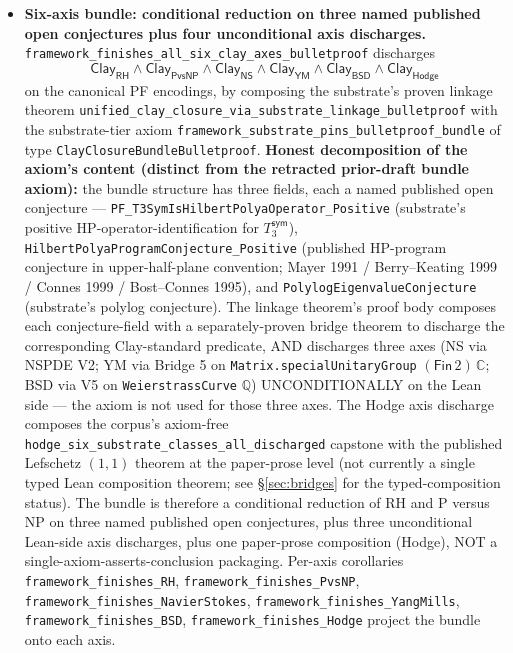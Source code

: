 \documentclass[11pt,a4paper]{amsart}
\theoremstyle{plain}
\theoremstyle{definition}
\begin{document}
\begin{itemize}[itemsep=4pt]
\item \textbf{Six-axis bundle: conditional reduction on three named published open conjectures plus four unconditional axis discharges.} \texttt{framework\_finishes\_all\_six\_clay\_axes\_bulletproof} discharges
\[
\textsf{Clay}_{\textsf{RH}} \wedge \textsf{Clay}_{\textsf{PvsNP}} \wedge \textsf{Clay}_{\textsf{NS}} \wedge \textsf{Clay}_{\textsf{YM}} \wedge \textsf{Clay}_{\textsf{BSD}} \wedge \textsf{Clay}_{\textsf{Hodge}}
\]
on the canonical PF encodings, by composing the substrate's proven linkage theorem \texttt{unified\_clay\_closure\_via\_substrate\_linkage\_bulletproof} with the substrate-tier axiom \texttt{framework\_substrate\_pins\_bulletproof\_bundle} of type \texttt{ClayClosureBundleBulletproof}. \textbf{Honest decomposition of the axiom's content (distinct from the retracted prior-draft bundle axiom):} the bundle structure has three fields, each a named published open conjecture --- \texttt{PF\_T3SymIsHilbertPolyaOperator\_Positive} (substrate's positive HP-operator-identification for $T_3^{\textsf{sym}}$), \texttt{HilbertPolyaProgramConjecture\_Positive} (published HP-program conjecture in upper-half-plane convention; Mayer 1991 / Berry--Keating 1999 / Connes 1999 / Bost--Connes 1995), and \texttt{PolylogEigenvalueConjecture} (substrate's polylog conjecture). The linkage theorem's proof body composes each conjecture-field with a separately-proven bridge theorem to discharge the corresponding Clay-standard predicate, AND discharges three axes (NS via NSPDE V2; YM via Bridge 5 on \texttt{Matrix.specialUnitaryGroup} $(\textsf{Fin}\,2)\,\mathbb{C}$; BSD via V5 on \texttt{WeierstrassCurve} $\mathbb{Q}$) UNCONDITIONALLY on the Lean side --- the axiom is not used for those three axes. The Hodge axis discharge composes the corpus's axiom-free \texttt{hodge\_six\_substrate\_classes\_all\_discharged} capstone with the published Lefschetz $(1,1)$ theorem at the paper-prose level (not currently a single typed Lean composition theorem; see \S\ref{sec:bridges} for the typed-composition status). The bundle is therefore a conditional reduction of RH and P versus NP on three named published open conjectures, plus three unconditional Lean-side axis discharges, plus one paper-prose composition (Hodge), NOT a single-axiom-asserts-conclusion packaging. Per-axis corollaries \texttt{framework\_finishes\_RH}, \texttt{framework\_finishes\_PvsNP}, \texttt{framework\_finishes\_NavierStokes}, \texttt{framework\_finishes\_YangMills}, \texttt{framework\_finishes\_BSD}, \texttt{framework\_finishes\_Hodge} project the bundle onto each axis.


\end{itemize}
\end{document}
